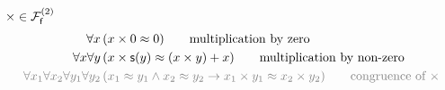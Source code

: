 
\begin{definition}
	[Multiplikation]
	\label{tab:addition:axioms}
	$\times\in\mcFfn[2]$
	\begin{align*}
	\forall x\,
	&(x\times 0 \mEQ 0) 
	\tag*{multiplication by zero}\\
	\forall x\forall y\,
	&(x\times\msucc(y) \mEQ (x\times y) + x)
	\tag*{multiplication by non-zero}
	\\
	\colG\forall x_1\forall x_2\forall y_1\forall y_2\,
	&\colG (x_1\mEQ y_1\land x_2\mEQ y_2 \limp x_1\times y_1\mEQ x_2 \times y_2)
	\tag*{congruence of $\times$}
	\end{align*}
\end{definition}










